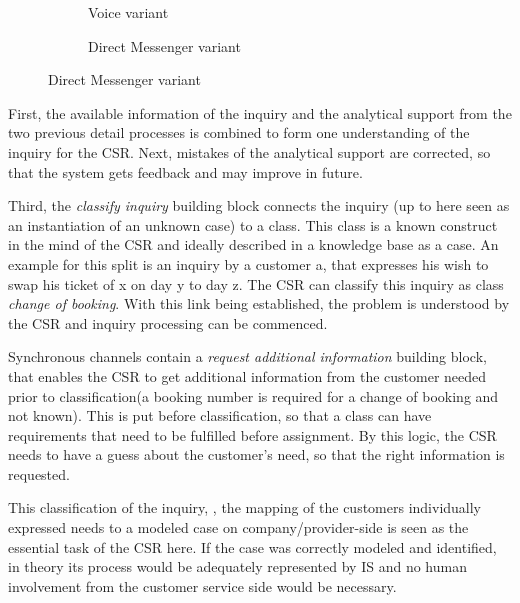 \begin{figure}[caption={Classify inquiry detail process}, label={fig:inbound:class}]
\begin{subfigure}[b]{.45\textwidth}
\begin{tikzpicture}
		
		\end{tikzpicture}
		\caption{Voice variant}\label{fig:inbound:class:voice}
	\end{subfigure}
	\begin{subfigure}[b]{.45\textwidth}
		\centering	
		\caption{Direct Messenger variant}\label{fig:inbound:class:dm}
	\end{subfigure}
\end{figure}

First, the available information of the inquiry and the analytical support from the two previous detail processes is combined to form one understanding of the inquiry for the \acrshort{CSR}. Next, mistakes of the analytical support are corrected, so that the system gets feedback and may improve in future.

Third, the \textit{ classify inquiry} building block connects the inquiry (up to here seen as an instantiation of an unknown case) to a class. This class is a known construct in the mind of the \acrfull{CSR} and ideally described in a knowledge base as a case. An example for this split is an inquiry by a customer a, that expresses his wish to swap his ticket of x on day y to day z. The \acrshort{CSR} can classify this inquiry as class \textit{change of booking}. With this link being established, the problem is understood by the  \acrshort{CSR} and inquiry processing can be commenced. 

Synchronous channels contain a \textit{request additional information} building block, that enables the \acrshort{CSR} to get additional information from the customer needed prior to classification(a booking number is required for a change of booking and not known). This is put before classification, so that a class can have requirements that need to be fulfilled before assignment. By this logic, the \acrshort{CSR} needs to have a guess about the customer's need, so that the right information is requested.  

This classification of the inquiry, \ie, the mapping of the customers individually expressed needs to a modeled case on company/provider-side is seen as the essential task of the \acrshort{CSR} here. If the case was correctly modeled and identified, in theory its process would be adequately represented by \acrshort{IS} and no human involvement from the customer service side would be necessary. 

